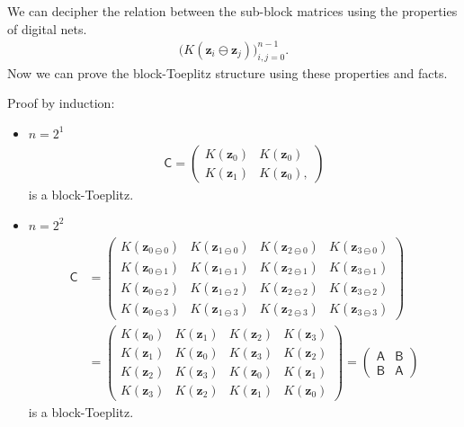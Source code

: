 \documentclass{iitthesis}          %
\newcommand{\bm}[1]{\boldsymbol{#1}}
\newcommand{\mB}{\mathsf{B}}
\newcommand{\vz}{\bm{z}}
\newcommand{\mA}{\mathsf{A}}
\newcommand{\mC}{\mathsf{C}}
\begin{document}
We can decipher the relation between the sub-block matrices using the properties of digital nets.
\begin{align*}
\bigl(K(\vz_i \ominus \vz_j)\bigr)_{i,j=0}^{n-1}.
\end{align*}
Now we can prove the block-Toeplitz structure using these properties and facts.
	
Proof by induction:
\begin{itemize}
	
	\item $n=2^1$
	\begin{align*}
	\mC = \begin{pmatrix}
	K(\vz_{0}) & K(\vz_{0}) \\ K(\vz_{1}) & K(\vz_{0}),
	\end{pmatrix}
	\end{align*}
	is a block-Toeplitz.
	
	\item $n=2^2$
	\begin{align*}
	\mC &= \begin{pmatrix}
	K(\vz_{0 \ominus 0}) & K(\vz_{1 \ominus 0}) & K(\vz_{2 \ominus 0}) & K(\vz_{3 \ominus 0}) \\
	K(\vz_{0 \ominus 1}) & K(\vz_{1 \ominus 1}) & K(\vz_{2 \ominus 1}) & K(\vz_{3 \ominus 1}) \\
	K(\vz_{0 \ominus 2}) & K(\vz_{1 \ominus 2}) & K(\vz_{2 \ominus 2}) & K(\vz_{3 \ominus 2}) \\
	K(\vz_{0 \ominus 3}) & K(\vz_{1 \ominus 3}) & K(\vz_{2 \ominus 3}) & K(\vz_{3 \ominus 3}) 
	\end{pmatrix} \\
	& = 
	\begin{pmatrix}
	K(\vz_{0}) & K(\vz_{1}) & K(\vz_{2}) & K(\vz_{3}) \\
	K(\vz_{1}) & K(\vz_{0}) & K(\vz_{3}) & K(\vz_{2}) \\
	K(\vz_{2}) & K(\vz_{3}) & K(\vz_{0}) & K(\vz_{1}) \\
	K(\vz_{3}) & K(\vz_{2}) & K(\vz_{1}) & K(\vz_{0}) 
	\end{pmatrix}
	=
	\begin{pmatrix}
	\mA & \mB \\ \mB & \mA
	\end{pmatrix}
	\end{align*}
	is a block-Toeplitz.
	

\end{itemize}
\end{document}
